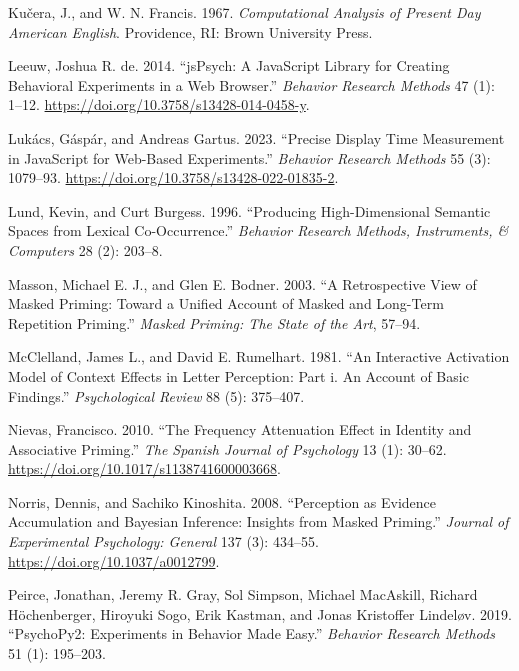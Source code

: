 \documentclass[
]{interact}
\newlength{\cslhangindent}
\newenvironment{CSLReferences}[2] %
 {\begin{list}{}{%
  \setlength{\itemindent}{0pt}
  \setlength{\leftmargin}{0pt}
  \setlength{\parsep}{0pt}
  \ifodd #1
   \setlength{\leftmargin}{\cslhangindent}
   \setlength{\itemindent}{-1\cslhangindent}
  \fi
  \setlength{\itemsep}{#2\baselineskip}}}
 {\end{list}}
\begin{document}
\begin{CSLReferences}{1}{0}
Kučera, J., and W. N. Francis. 1967. \emph{Computational Analysis of
Present Day American English}. Providence, RI: Brown University Press.

Leeuw, Joshua R. de. 2014. {``jsPsych: A JavaScript Library for Creating
Behavioral Experiments in a Web Browser.''} \emph{Behavior Research
Methods} 47 (1): 1--12. \url{https://doi.org/10.3758/s13428-014-0458-y}.

Lukács, Gáspár, and Andreas Gartus. 2023. {``Precise Display Time
Measurement in JavaScript for Web-Based Experiments.''} \emph{Behavior
Research Methods} 55 (3): 1079--93.
\url{https://doi.org/10.3758/s13428-022-01835-2}.

Lund, Kevin, and Curt Burgess. 1996. {``Producing High-Dimensional
Semantic Spaces from Lexical Co-Occurrence.''} \emph{Behavior Research
Methods, Instruments, {\&} Computers} 28 (2): 203--8.

Masson, Michael E. J., and Glen E. Bodner. 2003. {``A Retrospective View
of Masked Priming: Toward a Unified Account of Masked and Long-Term
Repetition Priming.''} \emph{Masked Priming: The State of the Art},
57--94.

McClelland, James L., and David E. Rumelhart. 1981. {``An Interactive
Activation Model of Context Effects in Letter Perception: Part i. An
Account of Basic Findings.''} \emph{Psychological Review} 88 (5):
375--407.

Nievas, Francisco. 2010. {``The Frequency Attenuation Effect in Identity
and Associative Priming.''} \emph{The Spanish Journal of Psychology} 13
(1): 30--62. \url{https://doi.org/10.1017/s1138741600003668}.

Norris, Dennis, and Sachiko Kinoshita. 2008. {``Perception as Evidence
Accumulation and Bayesian Inference: Insights from Masked Priming.''}
\emph{Journal of Experimental Psychology: General} 137 (3): 434--55.
\url{https://doi.org/10.1037/a0012799}.

Peirce, Jonathan, Jeremy R. Gray, Sol Simpson, Michael MacAskill,
Richard Höchenberger, Hiroyuki Sogo, Erik Kastman, and Jonas Kristoffer
Lindeløv. 2019. {``PsychoPy2: Experiments in Behavior Made Easy.''}
\emph{Behavior Research Methods} 51 (1): 195--203.


\end{CSLReferences}
\end{document}
